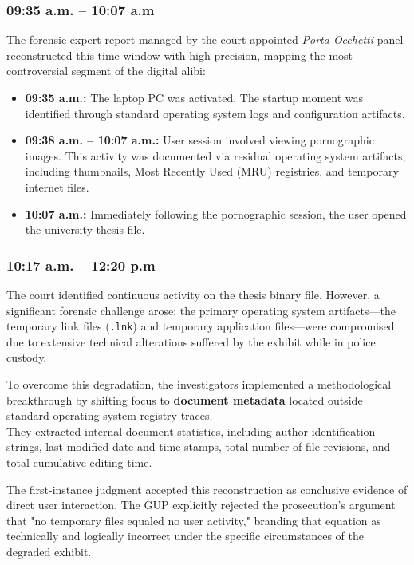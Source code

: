 \subsubsection*{09:35 a.m. – 10:07 a.m}
The forensic expert report managed by the court-appointed \textit{Porta-Occhetti} panel reconstructed this time window with high precision, mapping the most controversial segment of the digital alibi:
\begin{itemize}
    \item \textbf{09:35 a.m.:} The laptop PC was activated. The startup moment was identified through standard operating system logs and configuration artifacts.
    \item \textbf{09:38 a.m. – 10:07 a.m.:} User session involved viewing pornographic images. This activity was documented via residual operating system artifacts, including thumbnails, Most Recently Used (MRU) registries, and temporary internet files.
    \item \textbf{10:07 a.m.:} Immediately following the pornographic session, the user opened the university thesis file.
\end{itemize}

\subsubsection*{10:17 a.m. – 12:20 p.m}
The court identified continuous activity on the thesis binary file. However, a significant forensic challenge arose: the primary operating system artifacts—the temporary link files (\texttt{.lnk}) and temporary application files—were compromised due to extensive technical alterations suffered by the exhibit while in police custody.
\medskip

\noindent
To overcome this degradation, the investigators implemented a methodological breakthrough by shifting focus to \textbf{document metadata} located outside standard operating system registry traces.\\
They extracted internal document statistics, including author identification strings, last modified date and time stamps, total number of file revisions, and total cumulative editing time.
\medskip

\noindent
The first-instance judgment accepted this reconstruction as conclusive evidence of direct user interaction. The GUP explicitly rejected the prosecution's argument that "no temporary files equaled no user activity," branding that equation as technically and logically incorrect under the specific circumstances of the degraded exhibit.


